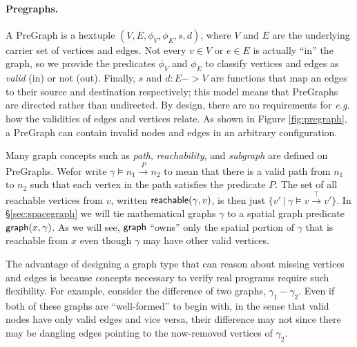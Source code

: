 \paragraph{Pregraphs.} A PreGraph is a hextuple $(V, E, \phi_V, \phi_E, s, d)$,
where $V$ and $E$ are the underlying carrier set of vertices and edges.  
Not every $v \in V$ or $e \in E$ is actually ``in'' the graph, so we provide 
the predicates $\phi_V$ and $\phi_E$ to classify vertices and edges as 
\emph{valid} (in) or not (out).  Finally, $s$ and $d : E -> V$ are functions that 
map an edges to their source and destination respectively; this model means that 
PreGraphs are directed rather than undirected.  By design, there are no requirements 
for \emph{e.g.} how the validities of edges and vertices relate.  As shown in 
Figure \ref{fig:pregraph}, a PreGraph can contain invalid nodes and edges in an 
arbitrary configuration.

Many graph concepts such as \emph{path}, \emph{reachability}, and \emph{subgraph} are 
defined on PreGraphs.  Wefor write $\gamma\models n_1 \xrightarrow{P} n_2$ to mean 
that there is a valid path from $n_1$ to $n_2$ such that each vertex in the path 
satisfies the predicate $P$.  The set of all reachable vertices from $v$, written $\mathsf{
reachable}(\gamma,v)$, is then just $\{v' ~|~ \gamma\models v \xrightarrow{\top} v'\}$.
In \S\ref{sec:spacegraph} we will tie mathematical graphs $\gamma$ to a spatial graph 
predicate
$\mathsf{graph}(x, \gamma)$.   As we will see, $\mathsf{graph}$ ``owns'' only the
spatial portion of $\gamma$ that is reachable
from $x$ even though $\gamma$ may have other valid vertices.

The advantage of designing a graph type that can reason about missing vertices and 
edges is because concepts necessary to verify real programs require such flexibility.  
For example, consider the difference of two graphs, $\gamma_1 - \gamma_2$.  Even if 
both of these graphs are ``well-formed'' to begin with, in the sense that valid nodes 
have only valid edges and vice versa, their difference may not since there may be 
dangling edges pointing to the now-removed vertices of $\gamma_2$.
\fi


\vspace{-0.75ex}
\iftrue
